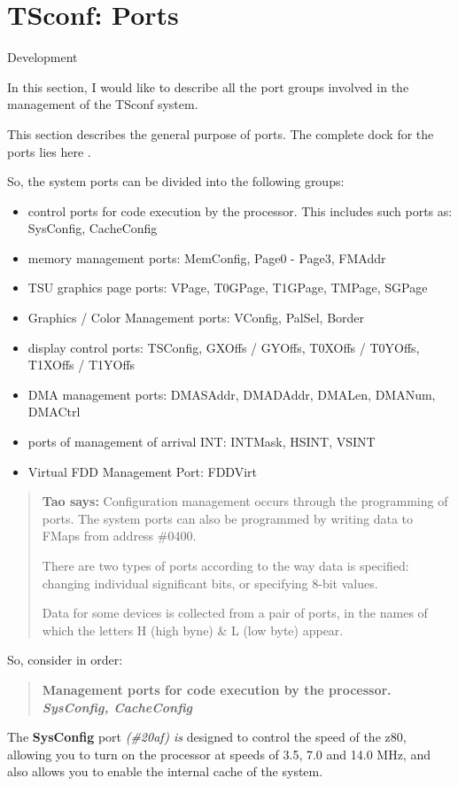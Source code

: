 \documentclass{article}
\begin{document}
\section*{TSconf: Ports}

Development

In this section, I would like to describe all the port groups involved
in the management of the TSconf system.

This section describes the general purpose of ports. The complete dock
for the ports lies here .

So, the system ports can be divided into the following groups:

\begin{itemize}
\item control ports for code execution by the processor. This includes
  such ports as: SysConfig, CacheConfig
\item memory management ports: MemConfig, Page0 - Page3, FMAddr
\item TSU graphics page ports: VPage, T0GPage, T1GPage, TMPage, SGPage
\item Graphics / Color Management ports: VConfig, PalSel, Border
\item display control ports: TSConfig, GXOffs / GYOffs, T0XOffs /
  T0YOffs, T1XOffs / T1YOffs
\item DMA management ports: DMASAddr, DMADAddr, DMALen, DMANum,
  DMACtrl
\item ports of management of arrival INT: INTMask, HSINT, VSINT
\item Virtual FDD Management Port: FDDVirt
\end{itemize}

\begin{quotation}
  \textbf{Tao says:} Configuration management occurs through the
  programming of ports. The system ports can also be programmed by
  writing data to FMaps from address \#0400.

  There are two types of ports according to the way data is specified:
  changing individual significant bits, or specifying 8-bit values.

  Data for some devices is collected from a pair of ports, in the
  names of which the letters H (high byne) \& L (low byte) appear.
\end{quotation}

So, consider in order:

\begin{quotation}
\textbf{Management ports for code execution by the
  processor. \emph{SysConfig, CacheConfig}}
\end{quotation}
The \textbf{SysConfig} port \emph{(\#20af) is} designed to control the
speed of the z80, allowing you to turn on the processor at speeds of
3.5, 7.0 and 14.0 MHz, and also allows you to enable the internal
cache of the system.
\end{document}
